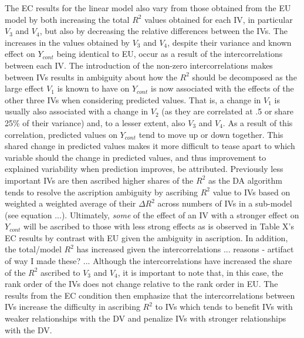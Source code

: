 \documentclass[ShortAfour,times,sageapa]{sagej}
\begin{document}
	
	The EC results for the linear model also vary from those obtained from the EU model by both increasing the total $R^2$ values obtained for each IV, in particular $V_3$ and $V_4$, but also by decreasing the relative differences between the IVs.
	The increases in the values obtained by $V_3$ and $V_4$, despite their variance and known effect on $Y_{cont}$ being identical to EU, occur as a result of the intercorrelations between each IV.  
	The introduction of the non-zero intercorrelations makes between IVs results in ambiguity about how the $R^2$ should be decomposed as the large effect $V_1$ is known to have on $Y_{cont}$ is now associated with the effects of the other three IVs when considering predicted values.  
	That is, a change in $V_1$ is usually also associated with a change in $V_2$ (as they are correlated at .5 or share 25\% of their variance) and, to a lesser extent, also $V_3$ and $V_4$.
	As a result of this correlation, predicted values on $Y_{cont}$ tend to move up or down together.
	This shared change in predicted values makes it more difficult to tease apart to which variable should the change in predicted values, and thus improvement to explained variability when prediction improves, be attributed.
	Previously less important IVs are then ascribed higher shares of the $R^2$ as the DA algorithm tends to resolve the ascription ambiguity by ascribing $R^2$ value to IVs based on weighted a weighted average of their $\Delta R^2$ across numbers of IVs in a sub-model (see equation ...).  
	Ultimately, \emph{some} of the effect of an IV with a stronger effect on $Y_{cont}$ will be ascribed to those with less strong effects as is observed in Table X's EC results by contrast with EU given the ambiguity in ascription.
	In addition, the total/model $R^2$ has increased given the intercorrelations ... reasons - artifact of way I made these? ...
	Although the intercorrelations have increased the share of the $R^2$ ascribed to $V_3$ and $V_4$, it is important to note that, in this case, the rank order of the IVs does not change relative to the rank order in EU.
	The results from the EC condition then emphasize that the intercorrelations between IVs increase the difficulty in ascribing $R^2$ to IVs which tends to benefit IVs with weaker relationships with the DV and penalize IVs with stronger relationships with the DV.	
	
\end{document}
